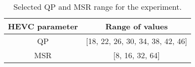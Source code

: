\begin{table}[]
    \centering
    \begin{tabular}{|c|c|}
        \hline
        HEVC parameter & Range of values \\
        \hline
        \hline
        QP & [18, 22, 26, 30, 34, 38, 42, 46] \\
        \hline
        MSR & [8, 16, 32, 64] \\
        \hline
    \end{tabular}
    \caption[Selected QP and MSR range for the experiment]
    {Selected QP and MSR range for the experiment.}
    \label{tab:qp_msr_range}
\end{table}